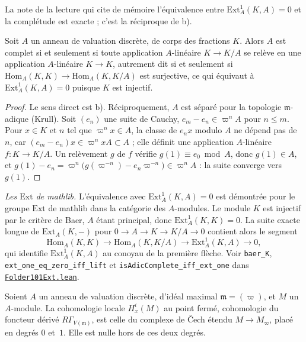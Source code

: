 La note de la lecture qui cite de mémoire l'équivalence entre $\mathrm{Ext}^1_A(K, A) = 0$ et la complétude est exacte ; c'est la réciproque de b).

\begin{enonce}\label{thm:101-reciproque}
Soit $A$ un anneau de valuation discrète, de corps des fractions $K$. Alors $A$ est complet si et seulement si toute application $A$-linéaire $K \to K/A$ se relève en une application $A$-linéaire $K \to K$, autrement dit si et seulement si $\mathrm{Hom}_A(K, K) \to \mathrm{Hom}_A(K, K/A)$ est surjective, ce qui équivaut à $\mathrm{Ext}^1_A(K, A) = 0$ puisque $K$ est injectif.
\end{enonce}

\begin{proof}
Le sens direct est b). Réciproquement, $A$ est séparé pour la topologie $\mathfrak m$-adique (Krull). Soit $(e_n)$ une suite de Cauchy, $e_m - e_n \in \varpi^n A$ pour $n \leqslant m$. Pour $x \in K$ et $n$ tel que $\varpi^n x \in A$, la classe de $e_n x$ modulo $A$ ne dépend pas de $n$, car $(e_m - e_n) x \in \varpi^n x A \subset A$ ; elle définit une application $A$-linéaire $f : K \to K/A$. Un relèvement $g$ de $f$ vérifie $g(1) \equiv e_0 \bmod A$, donc $g(1) \in A$, et $g(1) - e_n = \varpi^n \bigl(g(\varpi^{-n}) - e_n \varpi^{-n}\bigr) \in \varpi^n A$ : la suite converge vers $g(1)$.
\end{proof}

\noindent\emph{Les $\mathrm{Ext}$ de mathlib.} L'équivalence avec $\mathrm{Ext}^1_A(K, A) = 0$ est démontrée pour le groupe $\mathrm{Ext}$ de mathlib dans la catégorie des $A$-modules. Le module $K$ est injectif par le critère de Baer, $A$ étant principal, donc $\mathrm{Ext}^1_A(K, K) = 0$. La suite exacte longue de $\mathrm{Ext}_A(K, -)$ pour $0 \to A \to K \to K/A \to 0$ contient alors le segment
\[\mathrm{Hom}_A(K, K) \to \mathrm{Hom}_A(K, K/A) \to \mathrm{Ext}^1_A(K, A) \to 0,\]
qui identifie $\mathrm{Ext}^1_A(K, A)$ au conoyau de la première flèche. Voir \texttt{baer\_K}, \texttt{ext\_one\_eq\_zero\_iff\_lift} et \texttt{isAdicComplete\_iff\_ext\_one} dans \href{\leanblobmain/AlgebraicGeometry/Folder101Ext.lean}{\texttt{Folder101Ext.\allowbreak{}lean}}.

\begin{enonce}
Soient $A$ un anneau de valuation discrète, d'idéal maximal $\mathfrak m = (\varpi)$, et $M$ un $A$-module. La cohomologie locale $H^i_x(M)$ au point fermé, cohomologie du foncteur dérivé $R\Gamma_{V(\mathfrak m)}$, est celle du complexe de Čech étendu $M \to M_\varpi$, placé en degrés $0$ et~$1$. Elle est nulle hors de ces deux degrés.
\end{enonce}

